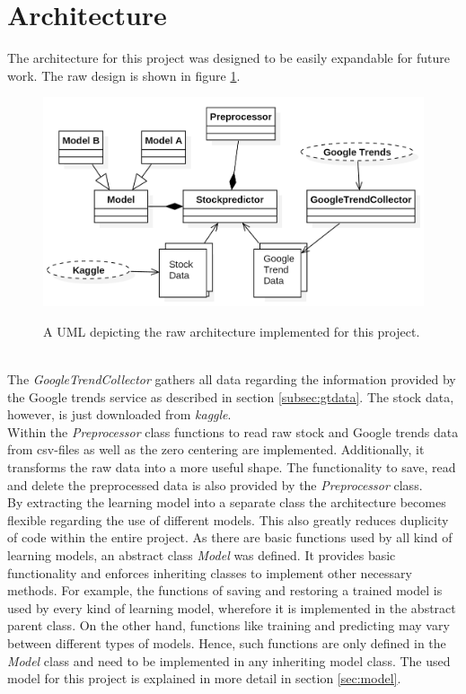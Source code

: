 \section{Architecture}
\label{sec:architecture}
The architecture for this project was designed to be easily expandable for future work. The raw design is shown in figure \ref{fig:architecture}. 
\begin{figure}[!ht]
	\caption{A UML depicting the raw architecture implemented for this project. }
	\includegraphics[width=0.95\linewidth]{images/architecture.png}
	\label{fig:architecture}
\end{figure}
\\
The \textit{GoogleTrendCollector} gathers all data regarding the information provided by the Google trends service as described in section \ref{subsec:gtdata}. The stock data, however, is just downloaded from \textit{kaggle}. 
\\
Within the \textit{Preprocessor} class functions to read raw stock and Google trends data from csv-files as well as the zero centering are implemented. Additionally, it transforms the raw data into a more useful shape. The functionality to save, read and delete the preprocessed data is also provided by the \textit{Preprocessor} class. 
\\
By extracting the learning model into a separate class the architecture becomes flexible regarding the use of different models. This also greatly reduces duplicity of code within the entire project. As there are basic functions used by all kind of learning models, an abstract class \textit{Model} was defined. It provides basic functionality and enforces inheriting classes to implement other necessary methods. For example, the functions of saving and restoring a trained model is used by every kind of learning model, wherefore it is implemented in the abstract parent class. On the other hand, functions like training and predicting may vary between different types of models. Hence, such functions are only defined in the \textit{Model} class and need to be implemented in any inheriting model class. The used model for this project is explained in more detail in section \ref{sec:model}. 
